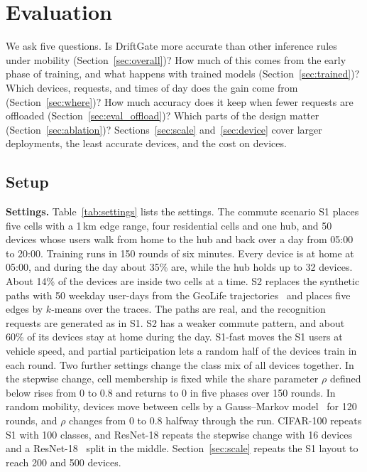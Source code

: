 \section{Evaluation}
\label{sec:evaluation}

We ask five questions. Is DriftGate more accurate than other inference rules under mobility (Section~\ref{sec:overall})? How much of this comes from the early phase of training, and what happens with trained models (Section~\ref{sec:trained})? Which devices, requests, and times of day does the gain come from (Section~\ref{sec:where})? How much accuracy does it keep when fewer requests are offloaded (Section~\ref{sec:eval_offload})? Which parts of the design matter (Section~\ref{sec:ablation})? Sections~\ref{sec:scale} and~\ref{sec:device} cover larger deployments, the least accurate devices, and the cost on devices.

\subsection{Setup}
\label{sec:setup}

\textbf{Settings.} Table~\ref{tab:settings} lists the settings. The commute scenario S1 places five cells with a 1\,km edge range, four residential cells and one hub, and 50 devices whose users walk from home to the hub and back over a day from 05:00 to 20:00. Training runs in 150 rounds of six minutes. Every device is at home at 05:00, and during the day about 35\% are, while the hub holds up to 32 devices. About 14\% of the devices are inside two cells at a time. S2 replaces the synthetic paths with 50 weekday user-days from the GeoLife trajectories~\cite{zheng2010geolife} and places five edges by $k$-means over the traces. The paths are real, and the recognition requests are generated as in S1. S2 has a weaker commute pattern, and about 60\% of its devices stay at home during the day. S1-fast moves the S1 users at vehicle speed, and partial participation lets a random half of the devices train in each round. Two further settings change the class mix of all devices together. In the stepwise change, cell membership is fixed while the share parameter $\rho$ defined below rises from 0 to 0.8 and returns to 0 in five phases over 150 rounds. In random mobility, devices move between cells by a Gauss--Markov model~\cite{liang1999gaussmarkov} for 120 rounds, and $\rho$ changes from 0 to 0.8 halfway through the run. CIFAR-100 repeats S1 with 100 classes, and ResNet-18 repeats the stepwise change with 16 devices and a ResNet-18~\cite{he2016resnet} split in the middle. Section~\ref{sec:scale} repeats the S1 layout to reach 200 and 500 devices.

